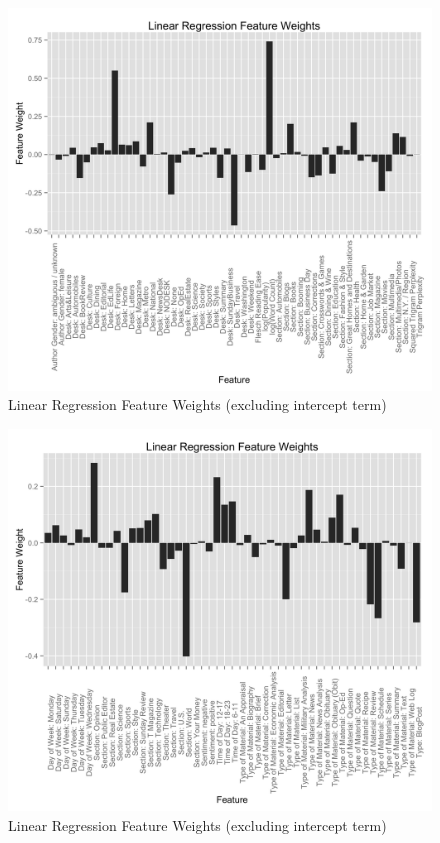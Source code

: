 \documentclass[fleqn,12pt]{SelfArx} %
\begin{document}
\begin{figure}[ht]\centering
\includegraphics[width=\linewidth]{feature_weights.png}
\caption{Linear Regression Feature Weights (excluding intercept term)}
\label{fig:lin_reg_weights1}
\end{figure}

\begin{figure}[ht]\centering
\includegraphics[width=\linewidth]{feature_weights_contd.png}
\caption{Linear Regression Feature Weights (excluding intercept term)}
\label{fig:lin_reg_weights2}
\end{figure}
\end{document}
